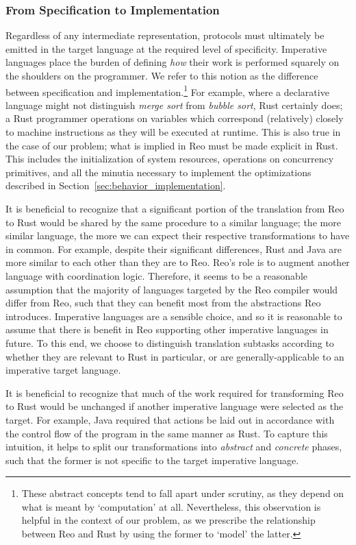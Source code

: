 \subsubsection{From Specification to Implementation}
Regardless of any intermediate representation, protocols must ultimately be emitted in the target language at the required level of specificity. Imperative languages place the burden of defining \textit{how} their work is performed squarely on the shoulders on the programmer. We refer to this notion as the difference between specification and implementation.\footnote{These abstract concepts tend to fall apart under scrutiny, as they depend on what is meant by `computation' at all. Nevertheless, this observation is helpful in the context of our problem, as we prescribe the relationship between Reo and Rust by using the former to `model' the latter.} For example, where a declarative language might not distinguish \textit{merge sort} from \textit{bubble sort}, Rust certainly does; a Rust programmer operations on variables which correspond (relatively) closely to machine instructions as they will be executed at runtime. This is also true in the case of our problem; what is implied in Reo must be made explicit in Rust. This includes the initialization of system resources, operations on concurrency primitives, and all the minutia necessary to implement the optimizations described in Section~\ref{sec:behavior_implementation}. 

It is beneficial to recognize that a significant portion of the translation from Reo to Rust would be shared by the same procedure to a similar language; the more similar language, the more we can expect their respective transformations to have in common. For example, despite their significant differences, Rust and Java are more similar to each other than they are to Reo. Reo's role is to augment another language with coordination logic. Therefore, it seems to be a reasonable assumption that the majority of languages targeted by the Reo compiler would differ from Reo, such that they can benefit most from the abstractions Reo introduces. Imperative languages are a sensible choice, and so it is reasonable to assume that there is benefit in Reo supporting other imperative languages in future. To this end, we choose to distinguish translation subtasks according to whether they are relevant to Rust in particular, or are generally-applicable to an imperative target language.

It is beneficial to recognize that much of the work required for transforming Reo to Rust would be unchanged if another imperative language were selected as the target. For example, Java required that actions be laid out in accordance with the control flow of the program in the same manner as Rust. To capture this intuition, it helps to split our transformations into \textit{abstract} and \textit{concrete} phases, such that the former is not specific to the target imperative language. 

